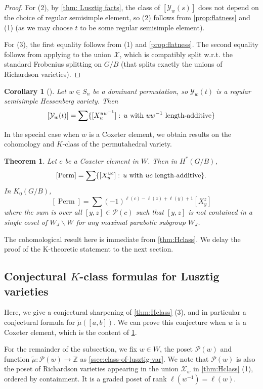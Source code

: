 \documentclass[10pt,a4paper]{amsart}
\newtheorem{theorem}[Thm]{Theorem}
\newtheorem{corollary}[Thm]{Corollary}
\DeclareMathOperator{\Perm}{Perm}
\newcommand{\ZZ}{\mathbb{Z}}
\def\calP{\mathcal{P}}
\def\calX{\mathcal{X}}
\def\mob{\tilde{\mu}}
\newcommand\calY{{\mathcal Y}}
\renewcommand{\colon}{\mathrel{:}}
\renewcommand{\colon}{:\mkern\thinmuskip}
\begin{document}
\begin{proof}
  For (2), by \cref{thm: Lusztig facts}, the class of $[\calY_w(s)]$ does not
  depend on the choice of regular semisimple element, so (2) follows from \cref{prop:flatness} and (1) (as we may choose $t$ to be some
  regular semisimple element).
  
  For (3), the first equality follows from (1) and \cref{prop:flatness}.
  The second equality follows from applying \cite[Theorem 1]{K09} to
  the union $\calX$, which is compatibly split w.r.t. the standard Frobenius
  splitting on $G/B$ (that splits exactly the unions of Richardson varieties).
\end{proof}



\begin{corollary}[{\cite[Equation (14)]{AT10}}]
 Let $w\in S_n$ be a dominant permutation,
    so $\calY_w(t)$ is a regular semisimple Hessenberg variety.
    Then
    \[ [\calY_w(t)] =
      \sum \{ [X_{u}^{uw^{-1}}] \colon u\text{ with }uw^{-1}\text{ length-additive} \} \]
\end{corollary}

In the special case when $w$ is a Coxeter element, we obtain results on the cohomology and $K$-class of the permutahedral variety. 

\begin{theorem}\label{thm:k-cohom-formulas-for-perm}
	    Let $c$ be a Coxeter element in $W$. Then in $H^*(G/B)$, 
	\[ [\Perm] = \sum \{ [X_{u}^{uc}] \colon u\text{ with }uc\text{ length-additive} \}. \]
	In $K_0(G/B)$, 
	\[[\Perm] = \sum (-1)^{\ell(c)-\ell(z) + \ell(y)+1} [X_y^z]\]
	where the sum is over all $[y,z] \in \calP(c)$ such that $[y,z]$ is not contained in a single coset of $W_J \backslash W$ for any maximal parabolic subgroup $W_J$.
\end{theorem}
The cohomological result here is immediate from \cref{thm:Hclass}. We delay the proof of the K-theoretic statement to the next section.

\subsection{Conjectural $K$-class formulas for Lusztig varieties}
Here, we give a conjectural sharpening of \cref{thm:Hclass} (3), and in particular a conjectural formula for $\mob([a,b])$. We can prove this conjecture when $w$ is a Coxeter element, which is the content of \cref{thm:k-cohom-formulas-for-perm}.




 For the remainder of the subsection, we fix $w \in W$, the poset $\calP(w)$ and function $\mob: \calP(w) \to \ZZ$ as \cref{ssec:class-of-lusztig-var}. We note that $\calP(w)$ is also the poset of Richardson varieties appearing in the union $\calX_w$ in \cref{thm:Hclass} (1), ordered by containment. It is a graded poset of rank $\ell(w^{-1})= \ell(w)$.
 
\end{document}
